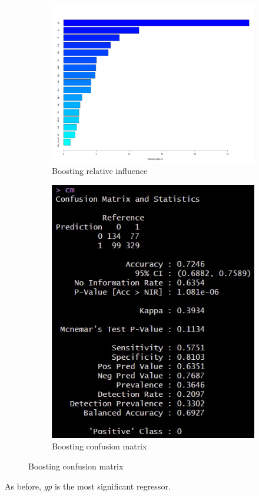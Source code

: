 \begin{figure}[H]
	\centering
	\begin{subfigure}{.5\textwidth}
		\centering
		\includegraphics[width=0.6\linewidth]{ImageFiles/Classification/boost_4_rel_inf}
		\caption{Boosting relative influence}
		\label{fig:boost_4_rel_inf}
	\end{subfigure}%
	\hfill
	\begin{subfigure}{.5\textwidth}
		\centering
		\includegraphics[width=0.4\linewidth]{ImageFiles/Classification/boost_4_conf_mat}
		\caption{Boosting confusion matrix}
		\label{fig:boost_4_conf_mat}
	\end{subfigure}
\end{figure}

As before, \textit{gp} is the most significant regressor.

